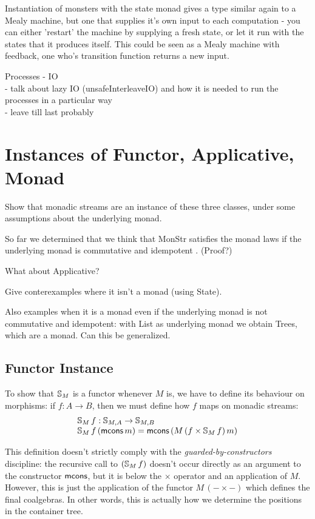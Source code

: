 \documentclass{article}
\begin{document}
Instantiation of monsters with the state monad gives a type similar again to a Mealy machine, but one that supplies it's own input to each computation - you can either 'restart' the machine by supplying a fresh state, or let it run with the states that it produces itself. This could be seen as a Mealy machine with feedback, one who's transition function returns a new input. 



Processes - IO \\
 - talk about lazy IO (unsafeInterleaveIO) and how it is needed to run the processes in a particular way \\
 - leave till last probably \\

\section{Instances of Functor, Applicative, Monad}

Show that monadic streams are an instance of these three classes, under some assumptions about the underlying monad.

So far we determined that we think that MonStr satisfies the monad laws if the underlying monad is commutative and idempotent \cite{idempotent_monads}. (Proof?)

What about Applicative?

Give conterexamples where it isn't a monad (using State).

Also examples when it is a monad even if the underlying monad is not commutative and idempotent: with List as underlying monad we obtain Trees, which are a monad. Can this be generalized.

\subsection{Functor Instance}

To show that $\mathbb{S}_{M}$ is a functor whenever $M$ is, we have to define its behaviour on morphisms: if $f:A\rightarrow B$, then we must define how $f$ maps on monadic streams:
$$
\begin{array}{l}
\mathbb{S}_{M}\,f : \mathbb{S}_{M,A} \rightarrow \mathbb{S}_{M,B}\\
\mathbb{S}_{M}\,f\,(\mathsf{mcons}\,m) = \mathsf{mcons}\,(M\,(f\times \mathbb{S}_{M}\,f)\,m)
\end{array}
$$

This definition doesn't strictly comply with the {\em guarded-by-constructors} discipline: the recursive call to $(\mathbb{S}_{M}\,f)$ doesn't occur directly as an argument to the constructor $\mathsf{mcons}$, but it is below the $\times$ operator and an application of $M$.
However, this is just the application of the functor $M\,(- \times -)$ which defines the final coalgebras. In other words, this is actually how we determine the positions in the container tree.
\end{document}
